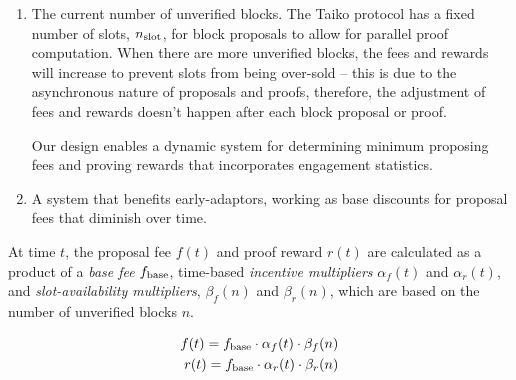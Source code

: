 \documentclass[9pt,oneside]{amsart}
\begin{document}
\begin{multicols}{2}
\begin{enumerate}
\item The current number of unverified blocks. The Taiko protocol has a fixed number of slots, $n_\textnormal{slot}$, for block proposals to allow for parallel proof computation. When there are more unverified blocks, the fees and rewards will increase to prevent slots from being over-sold -- this is due to the asynchronous nature of proposals and proofs, therefore, the adjustment of fees and rewards doesn't happen after each block proposal or proof.

Our design enables a dynamic system for determining minimum proposing fees and proving rewards that incorporates engagement statistics.
\item A system that benefits early-adaptors, working as base discounts for proposal fees that diminish over time.
\end{enumerate}


At time $t$, the proposal fee $f(t)$ and proof reward $r(t)$ are calculated as a product of a \textit{base fee} $f_\textnormal{base}$, time-based \emph{incentive multipliers} $\alpha_f(t)$ and $\alpha_r(t)$, and \emph{slot-availability multipliers}, $\beta_f(n)$ and $\beta_r(n)$, which are based on the number of unverified blocks $n$. 

\begin{align}
f(t) = f_\textnormal{base} \cdot \alpha_f(t) \cdot \beta_f(n)
\\
r(t) = f_\textnormal{base}
\cdot \alpha_r(t) \cdot \beta_r(n)
\end{align}





\end{multicols}
\end{document}
